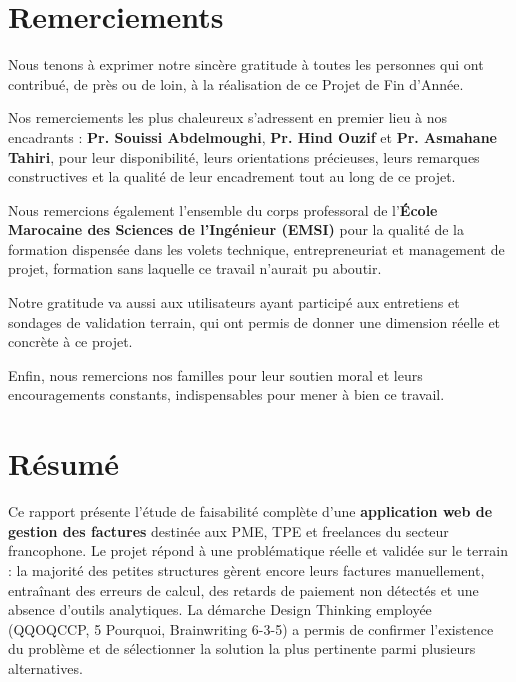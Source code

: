 \documentclass[12pt,a4paper]{report}
\begin{document}
\clearpage
\chapter*{Remerciements}

Nous tenons à exprimer notre sincère gratitude à toutes les personnes qui ont contribué, de près ou de loin, à la réalisation de ce Projet de Fin d'Année.

Nos remerciements les plus chaleureux s'adressent en premier lieu à nos encadrants : \textbf{Pr. Souissi Abdelmoughi}, \textbf{Pr. Hind Ouzif} et \textbf{Pr. Asmahane Tahiri}, pour leur disponibilité, leurs orientations précieuses, leurs remarques constructives et la qualité de leur encadrement tout au long de ce projet.

Nous remercions également l'ensemble du corps professoral de l'\textbf{École Marocaine des Sciences de l'Ingénieur (EMSI)} pour la qualité de la formation dispensée dans les volets technique, entrepreneuriat et management de projet, formation sans laquelle ce travail n'aurait pu aboutir.

Notre gratitude va aussi aux utilisateurs ayant participé aux entretiens et sondages de validation terrain, qui ont permis de donner une dimension réelle et concrète à ce projet.

Enfin, nous remercions nos familles pour leur soutien moral et leurs encouragements constants, indispensables pour mener à bien ce travail.

\clearpage
\chapter*{Résumé}

Ce rapport présente l'étude de faisabilité complète d'une \textbf{application web de gestion des factures} destinée aux PME, TPE et freelances du secteur francophone. Le projet répond à une problématique réelle et validée sur le terrain : la majorité des petites structures gèrent encore leurs factures manuellement, entraînant des erreurs de calcul, des retards de paiement non détectés et une absence d'outils analytiques. La démarche Design Thinking employée (QQOQCCP, 5 Pourquoi, Brainwriting 6-3-5) a permis de confirmer l'existence du problème et de sélectionner la solution la plus pertinente parmi plusieurs alternatives.
\end{document}
